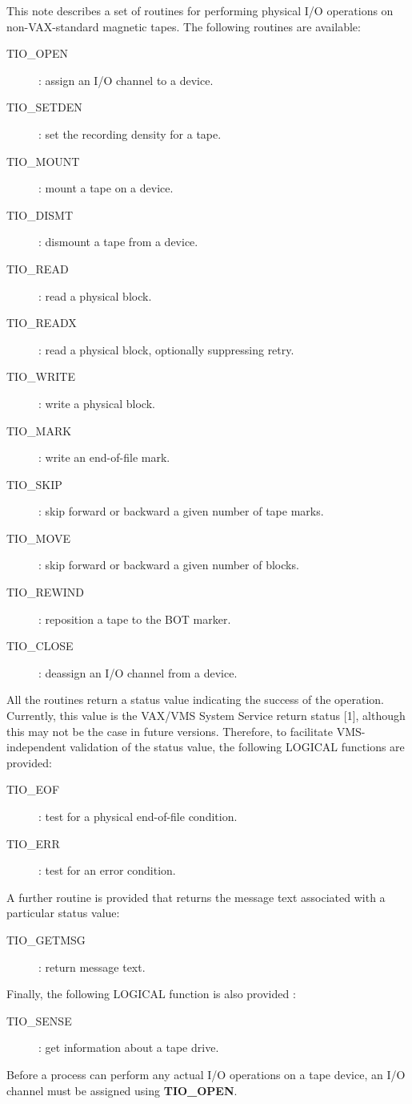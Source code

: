 This  note  describes  a  set  of  routines  for  performing  physical  I/O
operations on non-VAX-standard magnetic tapes.
The following routines are available:
\begin{description}
\begin{description}
\item[TIO\_OPEN]: assign an I/O channel to a device.
\item[TIO\_SETDEN]: set the recording density for a tape.
\item[TIO\_MOUNT]: mount a tape on a device.
\item[TIO\_DISMT]: dismount a tape from a device.
\item[TIO\_READ]: read a physical block.
\item[TIO\_READX]: read a physical block, optionally suppressing retry.
\item[TIO\_WRITE]: write a physical block.
\item[TIO\_MARK]: write an end-of-file mark.
\item[TIO\_SKIP]: skip forward or backward a given number of tape marks.
\item[TIO\_MOVE]: skip forward or backward a given number of blocks.
\item[TIO\_REWIND]: reposition a tape to the BOT marker.
\item[TIO\_CLOSE]: deassign an I/O channel from a device.
\end{description}
\end{description}
All the routines return a status value indicating the success of the operation.
Currently, this value is the VAX/VMS System Service return status [1], although
this may not be the case in future versions.
Therefore, to facilitate VMS-independent validation of the status value, the
following LOGICAL functions are provided:
\begin{description}
\begin{description}
\item[TIO\_EOF]: test for a physical end-of-file condition.
\item[TIO\_ERR]: test for an error condition.
\end{description}
\end{description}
A further routine is provided that returns the message text associated with a
particular status value:
\begin{description}
\begin{description}
\item[TIO\_GETMSG]: return message text.
\end{description}
\end{description}
Finally, the following LOGICAL function is also provided :
\begin{description}
\begin{description}
\item[TIO\_SENSE]: get information about a tape drive.
\end{description}
\end{description}
Before a process can perform any actual I/O operations on a tape device, an I/O
channel must be assigned using {\bf TIO\_OPEN}.

